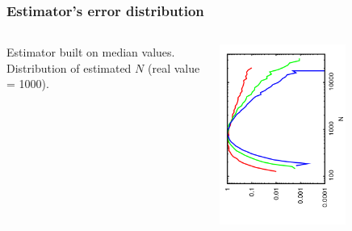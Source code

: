 \documentclass[14pt,green]{beamer}
\begin{document}
\begin{frame}
  \frametitle{Estimator's error distribution}
  \begin{columns}
    \begin{column}{0.4\textwidth}
       Estimator built on median values. Distribution of estimated $N$ (real value = 1000).
    \end{column}
    \begin{column}{0.6\textwidth}
      \begin{center}
        \includegraphics[angle=270, width=0.65\textwidth]{est_med.png}                                                             
      \end{center}
    \end{column}
  \end{columns}
\end{frame}
\end{document}
